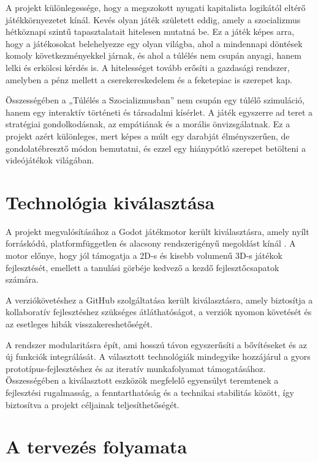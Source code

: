 \documentclass[12pt,a4paper]{article}
\begin{document}
A projekt különlegessége, hogy a megszokott nyugati kapitalista logikától eltérő játékkörnyezetet kínál. Kevés olyan játék született eddig, amely a szocializmus hétköznapi szintű tapasztalatait hitelesen mutatná be. Ez a játék képes arra, hogy a játékosokat belehelyezze egy olyan világba, ahol a mindennapi döntések komoly következményekkel járnak, és ahol a túlélés nem csupán anyagi, hanem lelki és erkölcsi kérdés is. A hitelességet tovább erősíti a gazdasági rendszer, amelyben a pénz mellett a cserekereskedelem és a feketepiac is szerepet kap.

Összességében a „Túlélés a Szocializmusban” nem csupán egy túlélő szimuláció, hanem egy interaktív történeti és társadalmi kísérlet. A játék egyszerre ad teret a stratégiai gondolkodásnak, az empátiának és a morális önvizsgálatnak. Ez a projekt azért különleges, mert képes a múlt egy darabját élményszerűen, de gondolatébresztő módon bemutatni, és ezzel egy hiánypótló szerepet betölteni a videójátékok világában.

\section{Technológia kiválasztása}

A projekt megvalósításához a Godot játékmotor került kiválasztásra, amely nyílt forráskódú, platformfüggetlen és alacsony rendszerigényű megoldást kínál \cite{godot_docs}. A motor előnye, hogy jól támogatja a 2D-s és kisebb volumenű 3D-s játékok fejlesztését, emellett a tanulási görbéje kedvező a kezdő fejlesztőcsapatok számára. 

A verziókövetéshez a GitHub szolgáltatása került kiválasztásra, amely biztosítja a kollaboratív fejlesztéshez szükséges átláthatóságot, a verziók nyomon követését és az esetleges hibák visszakereshetőségét.

A rendszer modularitásra épít, ami hosszú távon egyszerűsíti a bővítéseket és az új funkciók integrálását. A választott technológiák mindegyike hozzájárul a gyors prototípus-fejlesztéshez és az iteratív munkafolyamat támogatásához. Összességében a kiválasztott eszközök megfelelő egyensúlyt teremtenek a fejlesztési rugalmasság, a fenntarthatóság és a technikai stabilitás között, így biztosítva a projekt céljainak teljesíthetőségét.


\section{A tervezés folyamata}
\end{document}
